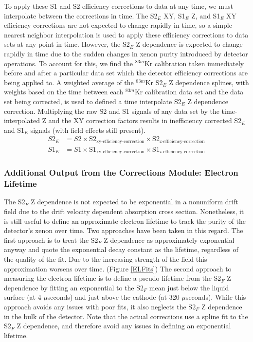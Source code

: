 To apply these S1 and S2 efficiency corrections to data at any time, we must interpolate between the corrections in time.  The S2$_E$ XY, S1$_E$ Z, and S1$_E$ XY efficiency corrections are not expected to change rapidly in time, so a simple nearest neighbor interpolation is used to apply these efficiency corrections to data sets at any point in time.  However, the S2$_E$ Z dependence is expected to change rapidly in time due to the sudden changes in xenon purity introduced by detector operations.  To account for this, we find the $^{83m}$Kr calibration taken immediately before and after a particular data set which the detector efficiency corrections are being applied to.  A weighted average of the $^{83m}$Kr S2$_E$ Z dependence splines, with weights based on the time between each $^{83m}$Kr calibration data set and the data set being corrected, is used to defined a time interpolate S2$_E$ Z dependence correction.  Multiplying the raw S2 and S1 signals of any data set by the time-interpolated Z and the XY correction factors results in inefficiency corrected S2$_E$ and S1$_E$ signals (with field effects still present).
\begin{align}
S2_E &=S2 \times \mbox{S}2_{\mbox{xy-efficiency-correction}} \times \mbox{S}2_{\mbox{z-efficiency-correction}} \\
S1_E &=S1 \times \mbox{S}1_{\mbox{xy-efficiency-correction}} \times \mbox{S}1_{\mbox{z-efficiency-correction}}
\end{align}

\subsubsection{Additional Output from the Corrections Module: Electron Lifetime}

The S2$_F$ Z dependence is not expected to be exponential in a nonuniform drift field due to the drift velocity dependent absorption cross section.  Nonetheless, it is still useful to define an approximate electron lifetime to track the purity of the detector's xenon over time.  Two approaches have been taken in this regard.  The first approach is to treat the S2$_F$ Z dependence as approximately exponential anyway and quote the exponential decay constant as the lifetime, regardless of the quality of the fit.  Due to the increasing strength of the field this approximation worsens over time. (Figure \ref{ELFits})  The second approach to measuring the electron lifetime is to define a pseudo-lifetime from the S2$_F$ Z dependence by fitting an exponential to the S2$_F$ mean just below the liquid surface (at 4 $\mu$seconds) and just above the cathode (at 320 $\mu$seconds).  While this approach avoids any issues with poor fits, it also neglects the S2$_F$ Z dependence in the bulk of the detector.  Note that the actual corrections use a spline fit to the S2$_F$ Z dependence, and therefore avoid any issues in defining an exponential lifetime.


